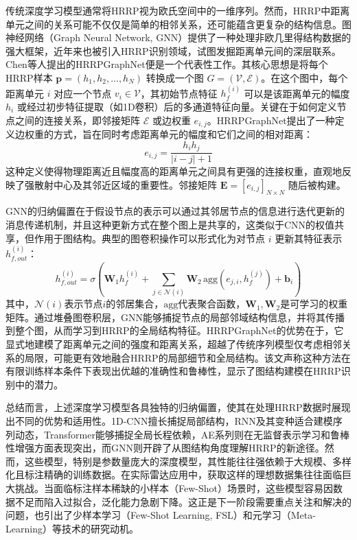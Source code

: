 传统深度学习模型通常将HRRP视为欧氏空间中的一维序列。然而，HRRP中距离单元之间的关系可能不仅仅是简单的相邻关系，还可能蕴含更复杂的结构信息。图神经网络（Graph Neural Network, GNN）提供了一种处理非欧几里得结构数据的强大框架，近年来也被引入HRRP识别领域，试图发掘距离单元间的深层联系。Chen等人提出的HRRPGraphNet便是一个代表性工作。其核心思想是将每个HRRP样本 $\mathbf{p} = (h_1, h_2, \dots, h_N)$ 转换成一个图 $G = (\mathcal{V}, \mathcal{E})$。在这个图中，每个距离单元 $i$ 对应一个节点 $v_i \in \mathcal{V}$，其初始节点特征 $h^{(i)}_f$ 可以是该距离单元的幅度 $h_i$ 或经过初步特征提取（如1D卷积）后的多通道特征向量。关键在于如何定义节点之间的连接关系，即邻接矩阵 $\mathcal{E}$ 或边权重 $e_{i,j}$。HRRPGraphNet提出了一种定义边权重的方式，旨在同时考虑距离单元的幅度和它们之间的相对距离：
\begin{equation}
    e_{i,j} = \frac{h_i h_j}{|i-j|+1}
    \label{eq:hrrpgraphnet_adjacency}
\end{equation}
这种定义使得物理距离近且幅度高的距离单元之间具有更强的连接权重，直观地反映了强散射中心及其邻近区域的重要性。邻接矩阵 $\mathbf{E} = [e_{i,j}]_{N \times N}$ 随后被构建。

GNN的归纳偏置在于假设节点的表示可以通过其邻居节点的信息进行迭代更新的消息传递机制，并且这种更新方式在整个图上是共享的，这类似于CNN的权值共享，但作用于图结构。典型的图卷积操作可以形式化为对节点 $i$ 更新其特征表示 $h^{(i)}_{f, out}$：
\begin{equation}
    h^{(i)}_{f, out} = \sigma \left( \mathbf{W}_1 h^{(i)}_f + \sum_{j \in \mathcal{N}(i)} \mathbf{W}_2 \, \text{agg}(e_{j,i}, h^{(j)}_f) + \mathbf{b}_i \right)
    \label{eq:hrrpgraphnet_graphconv}
\end{equation}
其中，$\mathcal{N}(i)$表示节点$i$的邻居集合，$\text{agg}$代表聚合函数，$\mathbf{W}_1, \mathbf{W}_2$是可学习的权重矩阵。通过堆叠图卷积层，GNN能够捕捉节点的局部邻域结构信息，并将其传播到整个图，从而学习到HRRP的全局结构特征。HRRPGraphNet的优势在于，它显式地建模了距离单元之间的强度和距离关系，超越了传统序列模型仅考虑相邻关系的局限，可能更有效地融合HRRP的局部细节和全局结构。该文声称这种方法在有限训练样本条件下表现出优越的准确性和鲁棒性，显示了图结构建模在HRRP识别中的潜力。

总结而言，上述深度学习模型各具独特的归纳偏置，使其在处理HRRP数据时展现出不同的优势和适用性。1D-CNN擅长捕捉局部结构，RNN及其变种适合建模序列动态，Transformer能够捕捉全局长程依赖，AE系列则在无监督表示学习和鲁棒性增强方面表现突出，而GNN则开辟了从图结构角度理解HRRP的新途径。然而，这些模型，特别是参数量庞大的深度模型，其性能往往强依赖于大规模、多样化且标注精确的训练数据。在实际雷达应用中，获取这样的理想数据集往往面临巨大挑战。当面临标注样本稀缺的小样本（Few-Shot）场景时，这些模型容易因数据不足而陷入过拟合，泛化能力急剧下降。这正是下一阶段需要重点关注和解决的问题，也引出了少样本学习（Few-Shot Learning, FSL）和元学习（Meta-Learning）等技术的研究动机。
